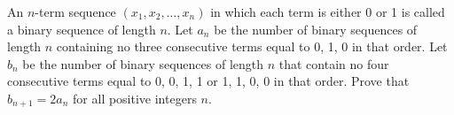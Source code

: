 An $n$-term sequence $(x_1, x_2, \ldots, x_n)$ in which each term is either 0 or 1 is called a binary sequence of length $n$.  Let $a_n$ be the number of binary sequences of length $n$ containing no three consecutive terms equal to 0, 1, 0 in that order.  Let $b_n$ be the number of binary sequences of length $n$ that contain no four consecutive terms equal to 0, 0, 1, 1 or 1, 1, 0, 0 in that order. Prove that $b_{n+1} = 2a_n$ for all positive integers $n$.